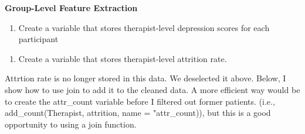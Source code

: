 \documentclass[]{book}
\newenvironment{Shaded}{\begin{snugshade}}{\end{snugshade}}
\newcommand{\CommentTok}[1]{\textcolor[rgb]{0.56,0.35,0.01}{\textit{#1}}}
\newcommand{\DataTypeTok}[1]{\textcolor[rgb]{0.13,0.29,0.53}{#1}}
\newcommand{\KeywordTok}[1]{\textcolor[rgb]{0.13,0.29,0.53}{\textbf{#1}}}
\newcommand{\NormalTok}[1]{#1}
\newcommand{\OperatorTok}[1]{\textcolor[rgb]{0.81,0.36,0.00}{\textbf{#1}}}
\newcommand{\OtherTok}[1]{\textcolor[rgb]{0.56,0.35,0.01}{#1}}
\newcommand{\StringTok}[1]{\textcolor[rgb]{0.31,0.60,0.02}{#1}}
\providecommand{\tightlist}{%
  \setlength{\itemsep}{0pt}\setlength{\parskip}{0pt}}
\theoremstyle{definition}
\theoremstyle{definition}
\theoremstyle{definition}
\theoremstyle{remark}
\begin{document}
\begin{Shaded}
\end{Shaded}

\textbf{Group-Level Feature Extraction}

\begin{enumerate}
\def\labelenumi{\arabic{enumi}.}
\tightlist
\item
  Create a variable that stores therapist-level depression scores for each participant
\end{enumerate}

\begin{Shaded}
\end{Shaded}

\begin{enumerate}
\def\labelenumi{\arabic{enumi}.}
\setcounter{enumi}{1}
\tightlist
\item
  Create a variable that stores therapist-level attrition rate.
\end{enumerate}

Attrtion rate is no longer stored in this data. We deselected it above. Below, I show how to use join to add it to the cleaned data. A more efficient way would be to create the attr\_count variable before I filtered out former patients. (i.e., add\_count(Therapist, attrition, name = "attr\_count)), but this is a good opportunity to using a join function.

\begin{Shaded}
\end{Shaded}
\end{document}
